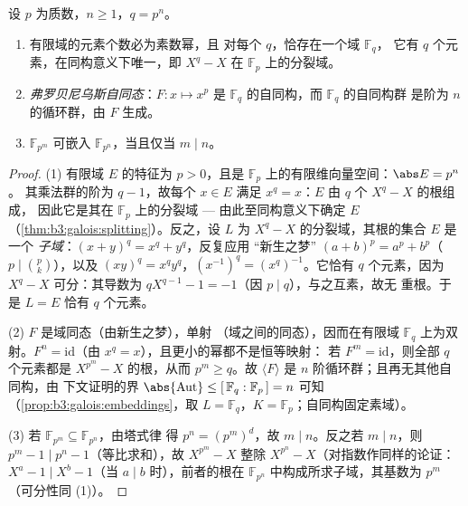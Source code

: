 \begin{theorem}\label{thm:b3:galois:finitefields}
设 $p$ 为质数，$n \geq 1$，$q = p^n$。
\begin{enumerate}
  \item 有限域的元素个数必为素数幂，且
        对每个 $q$，恰存在一个域 $\mathbb F_q$，
        它有 $q$ 个元素，在同构意义下唯一，即
        $X^q - X$ 在 $\mathbb F_p$ 上的分裂域。
  \item \emph{弗罗贝尼乌斯自同态}：$F
        \colon x \mapsto x^p$ 是 $\mathbb
        F_q$ 的自同构，而 $\mathbb F_q$ 的自同构群
        是阶为 $n$ 的循环群，由 $F$ 生成。
  \item $\mathbb F_{p^m}$ 可嵌入 $\mathbb F_{p^n}$，当且仅当 $m \mid
        n$。
\end{enumerate}
\end{theorem}

\begin{proof}
(1) 有限域 $E$ 的特征为 $p > 0$，且是
$\mathbb F_p$ 上的有限维向量空间：$\abs E = p^n$。
其乘法群的阶为 $q - 1$，故每个 $x \in E$
满足 $x^q = x$：$E$ 由 $q$ 个 $X^q - X$ 的根组成，
因此它是其在 $\mathbb F_p$ 上的分裂域 ---
由此至同构意义下确定 $E$
（\cref{thm:b3:galois:splitting}）。反之，设 $L$ 为
$X^q - X$ 的分裂域，其根的集合 $E$ 是一个
\emph{子域}：$(x + y)^q = x^q + y^q$，反复应用
“新生之梦” $(a+b)^p = a^p + b^p$（$p \mid \binom pk$），以及
$(xy)^q = x^qy^q$，$(x^{-1})^q = (x^q)^{-1}$。它恰有 $q$
个元素，因为 $X^q - X$ 可分：其导数为
$qX^{q-1} - 1 = -1$（因 $p \mid q$），与之互素，故无
重根。于是 $L = E$ 恰有 $q$ 个元素。

(2) $F$ 是域同态（由新生之梦），单射
（域之间的同态），因而在有限域 $\mathbb F_q$ 上为双射。$F^n =
\mathrm{id}$（由 $x^q = x$），且更小的幂都不是恒等映射：
若 $F^m = \mathrm{id}$，则全部 $q$ 个元素都是
$X^{p^m} - X$ 的根，从而 $p^m \geq q$。故 $\langle F\rangle$
是 $n$ 阶循环群；且再无其他自同构，由
下文证明的界 $\abs{\operatorname{Aut}} \leq [\,\mathbb F_q :
\mathbb F_p\,] = n$ 可知
（\cref{prop:b3:galois:embeddings}，取 $L = \mathbb F_q$，$K =
\mathbb F_p$；自同构固定素域）。

(3) 若 $\mathbb F_{p^m} \subseteq \mathbb F_{p^n}$，由塔式律
得 $p^n = (p^m)^d$，故 $m \mid n$。反之若 $m \mid n$，则
$p^m - 1 \mid p^n - 1$（等比求和），故 $X^{p^m} - X$ 整除
$X^{p^n} - X$（对指数作同样的论证：$X^{a} - 1 \mid X^{b}
- 1$（当 $a \mid b$ 时），前者的根在
$\mathbb F_{p^n}$ 中构成所求子域，其基数为
$p^m$（可分性同 (1)）。
\end{proof}


